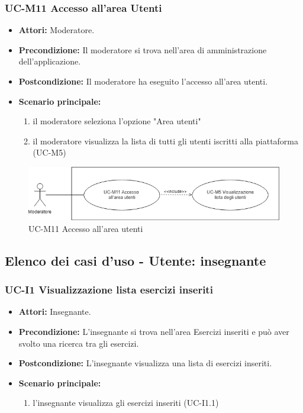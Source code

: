 \subsubsection{UC-M11 Accesso all'area Utenti}
\begin{itemize}
	\item \textbf{Attori:} Moderatore.
	\item \textbf{Precondizione:} Il moderatore si trova nell'area di amministrazione dell'applicazione.
	\item \textbf{Postcondizione:} Il moderatore ha eseguito l'accesso all'area utenti.
	\item \textbf{Scenario principale:}
	\begin{enumerate}
		\item il moderatore seleziona l'opzione "Area utenti"
		\item il moderatore visualizza la lista di tutti gli utenti iscritti alla piattaforma (UC-M5)
	\end{enumerate}
\end{itemize}

\begin{figure}[h]
		\centering
		\includegraphics[scale=0.7]{images/UC-M11.png}
		\caption{UC-M11 Accesso all'area utenti}
	\end{figure}	

\subsection{Elenco dei casi d'uso - Utente: insegnante}		
\subsubsection{UC-I1 Visualizzazione lista esercizi inseriti}
\begin{itemize}
\item \textbf{Attori: }Insegnante.
		\item \textbf{Precondizione: }L'insegnante si trova nell'area Esercizi inseriti e può aver svolto una ricerca tra gli esercizi.
		\item \textbf{Postcondizione: }L'insegnante visualizza una lista di esercizi inseriti. 
		\item \textbf{Scenario principale:}
		\begin{enumerate}
			\item l'insegnante visualizza gli esercizi inseriti (UC-I1.1)
		\end{enumerate}
	\end{itemize}

